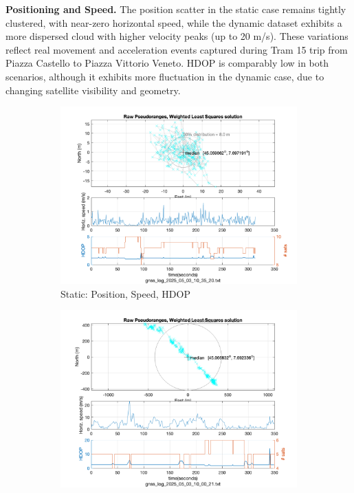         \vspace{0.5em}
        \textbf{Positioning and Speed.} 
        The position scatter in the static case remains tightly clustered, with near-zero horizontal speed, while the dynamic dataset exhibits a more dispersed cloud with higher velocity peaks (up to 20 m/s). These variations reflect real movement and acceleration events captured during Tram 15 trip from Piazza Castello to Piazza Vittorio Veneto. HDOP is comparably low in both scenarios, although it exhibits more fluctuation in the dynamic case, due to changing satellite visibility and geometry.
    
        \begin{figure}[h!]
            \centering
            \begin{subfigure}{0.23\textwidth}
                \includegraphics[width=\textwidth]{images/Monte_Cappuccini/filtered/Samsung_A51_Monte_Cappuccini_fig4.png}
                \caption{Static: Position, Speed, HDOP}
            \end{subfigure}
            \hfill
            \begin{subfigure}{0.23\textwidth}
                \includegraphics[width=\textwidth]{images/Tram_15_trip_Castello_to_Pescatore/filtered/Samsung_A51_Tram_15_trip_Castello_to_Pescatore_fig4.png}

\end{subfigure}
\end{figure}

